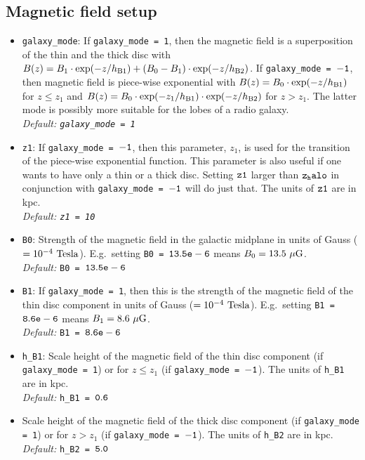\documentclass[11pt,twocolumn,a4paper]{article}
\begin{document}
\subsection{Magnetic field setup}
\label{sec:magnetic_field_setup}
\begin{itemize}
\item {\tt galaxy\_mode}: If {\tt galaxy\_mode = 1}, then the magnetic field is a superposition of the thin and the thick disc with $B(z) = B_1 \cdot \exp(-z/h_{\rm B1}) + (B_0-B_1)\cdot \exp(-z/h_{\rm B2})$.  If {\tt galaxy\_mode = $\tt -1$}, then magnetic field is piece-wise exponential with $B(z) = B_0\cdot \exp(-z/h_{\rm B1})$ for $z\leq z_1$ and $B(z) = B_0\cdot \exp(-z_1/h_{\rm B1})\cdot\exp(-z/h_{\rm B2})$ for $z>z_1$. The latter mode is possibly more suitable for the lobes of a radio galaxy.\\
\emph{Default: {\tt galaxy\_mode = 1}}
\item {\tt z1}: If {\tt galaxy\_mode = $\tt -1$}, then this parameter, $z_1$, is used for the transition of the piece-wise exponential function. This parameter is also useful if one wants to have only a thin or a thick disc. Setting $\tt z1$ larger than $\tt z_halo$ in conjunction with {\tt galaxy\_mode = $\tt -1$} will do just that. The units of $\tt z1$ are in kpc.\\
\emph{Default: {\tt z1 = 10}}
\item {\tt B0}: Strength of the magnetic field in the galactic midplane in units of Gauss ($= 10^{-4}~\rm Tesla$). E.g.\ setting {\tt B0 = $\tt 13.5e-6$} means $B_0 = 13.5~\mu\rm G$.
\\
\emph{Default:} {\tt B0 = $\tt 13.5e-6$}
\item {\tt B1}: If {\tt galaxy\_mode = 1}, then this is the strength of the magnetic field of the thin disc component in units of Gauss ($= 10^{-4}~\rm Tesla$). E.g.\ setting {\tt B1 = $\tt 8.6e-6$} means $B_1 = 8.6~\mu\rm G$.\\
\emph{Default:} {\tt B1 = $\tt 8.6e-6$}\\
\item {\tt h\_B1}: Scale height of the magnetic field of the thin disc component (if {\tt galaxy\_mode = 1}) or for $z\leq z_1$ (if {\tt galaxy\_mode = $\tt -1$}). The units of {\tt h\_B1} are in kpc.\\
\emph{Default:} {\tt h\_B1 = $\tt 0.6$}
\item Scale height of the magnetic field of the thick disc component (if {\tt galaxy\_mode = 1}) or for $z> z_1$ (if {\tt galaxy\_mode = $\tt -1$}). The units of {\tt h\_B2} are in kpc.\\
\emph{Default:} {\tt h\_B2 = $\tt 5.0$}
\end{itemize}
\end{document}

